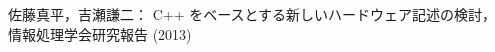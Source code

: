\begin{thebibliography}{99}
   佐藤真平，吉瀬謙二：
   C++ をベースとする新しいハードウェア記述の検討，
   情報処理学会研究報告 (2013)
\end{thebibliography}
